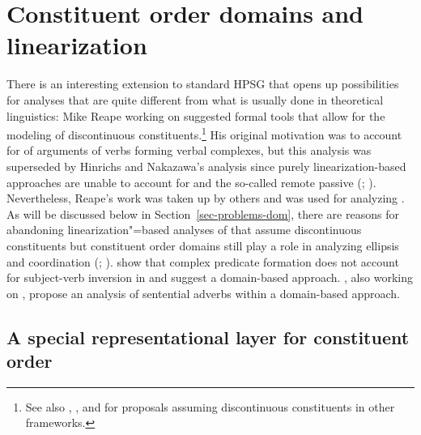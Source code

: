 \documentclass[output=paper,biblatex,babelshorthands,newtxmath,draftmode,colorlinks,citecolor=brown]{langscibook}
\begin{document}
\section{Constituent order domains and linearization}
\label{sec-domains}

There is an interesting extension to standard HPSG that opens up possibilities
for analyses that are quite different from what is usually done in theoretical linguistics: Mike
Reape \citeyearpar{Reape91,Reape92a,Reape94a} working on  suggested formal tools that
allow for the modeling of discontinuous constituents.\footnote{ See also , , and  for proposals assuming
  discontinuous constituents in other frameworks.%
} His original motivation was to account for  of arguments of verbs forming
verbal complexes, but this analysis was superseded by Hinrichs and Nakazawa's analysis
\citep{HN89a,HN94a} since purely linearization-based approaches are unable to account for 
and the so-called remote passive (\citealp[Section~5.1, Section~5.2]{Kathol98b};
\citealp[Chapter~21.1]{Mueller99a}). Nevertheless, Reape's work was taken up by others and was used
for analyzing 
\citep{KP95a,Kathol2000a,Mueller95c,Babel,Mueller2004b,Wetta2011a,Wetta2014a-u}. As will be
discussed below in Section~\ref{sec-problems-dom}, there are reasons for abandoning 
linearization"=based analyses of  that assume discontinuous constituents
\parencites{Mueller2005d}[Chapter~6]{MuellerGS} but constituent order domains still play a
role in analyzing ellipsis \crossrefchapterp[\pageref{ellipsis:ex-beavers-coordination-with-dom}]{ellipsis} and
coordination (\citealt{Yatabe2001,Crysmann2003a,BS2004a,YT2021a-u}; \crossrefchapteralt[\page
\pageref{page-linearization-domains-in-coordination-one},
\pageref{page-linearization-domains-in-coordination-two}]{coordination}).  \citet*{BGM99a} show that
complex predicate formation does not account for subject-verb inversion in  and suggest a
domain-based approach. \citet{BG2007b-u}, also working on , propose an analysis of sentential adverbs within
a domain-based approach.

\subsection{A special representational layer for constituent order}
\label{order:sec-domains}
\end{document}
